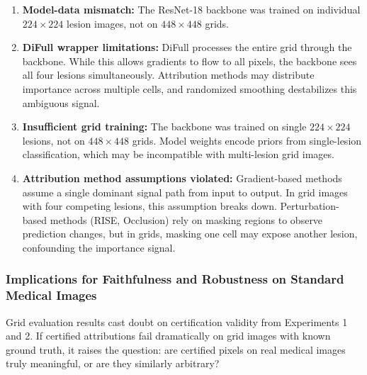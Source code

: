 \documentclass[11pt]{article}
\begin{document}
\begin{enumerate}
\item \textbf{Model-data mismatch:} The ResNet-18 backbone was trained on individual $224 \times 224$ lesion images, not on $448 \times 448$ grids. 


\item \textbf{DiFull wrapper limitations:} DiFull processes the entire grid through the backbone. While this allows gradients to flow to all pixels, the backbone sees all four lesions simultaneously. Attribution methods may distribute importance across multiple cells, and randomized smoothing destabilizes this ambiguous signal.

\item \textbf{Insufficient grid training:} The backbone was trained on single $224 \times 224$ lesions, not on $448 \times 448$ grids. Model weights encode priors from single-lesion classification, which may be incompatible with multi-lesion grid images. 


\item \textbf{Attribution method assumptions violated:} Gradient-based methods assume a single dominant signal path from input to output. In grid images with four competing lesions, this assumption breaks down. Perturbation-based methods (RISE, Occlusion) rely on masking regions to observe prediction changes, but in grids, masking one cell may expose another lesion, confounding the importance signal.
\end{enumerate}

\subsubsection{Implications for Faithfulness and Robustness on Standard Medical Images} 

Grid evaluation results cast doubt on certification validity from Experiments 1 and 2. If certified attributions fail dramatically on grid images with known ground truth, it raises the question: are certified pixels on real medical images truly meaningful, or are they similarly arbitrary?
\end{document}
